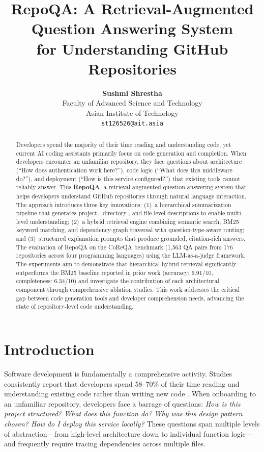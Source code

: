 \documentclass[11pt]{article}
\title{RepoQA: A Retrieval-Augmented Question Answering System\\for Understanding GitHub Repositories}
\author{
  \textbf{Sushmi Shrestha} \\
  Faculty of Advanced Science and Technology \\
  Asian Institute of Technology\\
  \texttt{st126526@ait.asia}
}
\date{}
\begin{document}
\maketitle

\begin{abstract}
Developers spend the majority of their time reading and understanding code, yet current AI coding assistants primarily focus on code generation and completion. When developers encounter an unfamiliar repository, they face questions about architecture (``How does authentication work here?''), code logic (``What does this middleware do?''), and deployment (``How is this service configured?'') that existing tools cannot reliably answer. This \textbf{RepoQA}, a retrieval-augmented question answering system that helps developers understand GitHub repositories through natural language interaction. The approach introduces three key innovations: (1)~a hierarchical summarization pipeline that generates project-, directory-, and file-level descriptions to enable multi-level understanding; (2)~a hybrid retrieval engine combining semantic search, BM25 keyword matching, and dependency-graph traversal with question-type-aware routing; and (3)~structured explanation prompts that produce grounded, citation-rich answers. The evaluation of RepoQA on the CoReQA benchmark (1,563 QA pairs from 176 repositories across four programming languages) using the LLM-as-a-judge framework. The experiments aim to demonstrate that hierarchical hybrid retrieval significantly outperforms the BM25 baseline reported in prior work (accuracy: 6.91/10, completeness: 6.34/10) and investigate the contribution of each architectural component through comprehensive ablation studies. This work addresses the critical gap between code generation tools and developer comprehension needs, advancing the state of repository-level code understanding.
\end{abstract}

\section{Introduction}

Software development is fundamentally a comprehensive activity. Studies consistently report that developers spend 58--70\% of their time reading and understanding existing code rather than writing new code \citep{xia2018measuring}. When onboarding to an unfamiliar repository, developers face a barrage of questions: \textit{How is this project structured? What does this function do? Why was this design pattern chosen? How do I deploy this service locally?} These questions span multiple levels of abstraction---from high-level architecture down to individual function logic---and frequently require tracing dependencies across multiple files.
\end{document}

